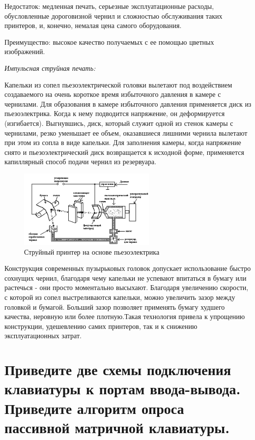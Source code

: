\documentclass[unicode, 12pt, a4paper, oneside]{article}
\begin{document}
Недостаток: медленная печать, серьезные эксплуатационные расходы, обусловленные дороговизной чернил и сложностью обслуживания таких принтеров, и, конечно, немалая цена самого оборудования.

Преимущество: высокое качество получаемых с ее помощью цветных изображений.

{\it Импульсная струйная печать:}

Капельки из сопел пьезоэлектрической головки вылетают под воздействием создаваемого на очень короткое время избыточного давления в камере с чернилами. Для образования в камере избыточного давления применяется диск из пьезоэлектрика. Когда к нему подводится напряжение, он деформируется (изгибается). Выгнувшись, диск, который служит одной из стенок камеры с чернилами, резко уменьшает ее объем, оказавшиеся лишними чернила вылетают при этом из сопла в виде капельки. Для заполнения камеры, когда напряжение снято и пьезоэлектрический диск возвращается к исходной форме, применяется капиллярный способ подачи чернил из резервуара. 

\begin{figure}[H]
\centering
\includegraphics[width=0.6\textwidth]{105_Strui.png}
\caption{Струйный принтер на основе пьезоэлектрика }
\end{figure}

Конструкция современных пузырьковых головок допускает использование быстро сохнущих чернил, благодаря чему капельки не успевают впитаться в бумагу или растечься - они просто моментально высыхают. Благодаря увеличению скорости, с которой из сопел выстреливаются капельки, можно увеличить зазор между головкой и бумагой. Больший зазор позволяет применять бумагу худшего качества, неровную или более плотную.Такая технология привела к упрощению конструкции, удешевлению самих принтеров, так и к снижению эксплуатационных затрат.

\section{Приведите две схемы подключения клавиатуры к портам ввода-вывода. Приведите алгоритм опроса пассивной матричной клавиатуры.}
\end{document}
